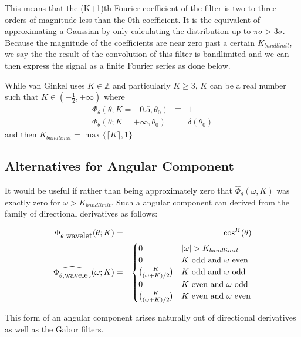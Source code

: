 \documentclass{article}
\DeclarePairedDelimiter\abs{\lvert}{\rvert}%
\begin{document}
This means that the (K+1)th Fourier coefficient of the filter is two to three orders of magnitude less than the 0th coefficient. It is the equivalent of approximating a Gaussian by only calculating the distribution up to $ \pi \sigma > 3 \sigma $. Because the magnitude of the coefficients are near zero past a certain $ K_{bandlimit} $, we say the the result of the convolution of this filter is bandlimited and we can then express the signal as a finite Fourier series as done below.

While van Ginkel uses $ K \in \mathbb{Z} $ and particularly $ K \geq 3 $, $ K $ can be a real number such that $ K \in (-\frac{1}{2},+\infty) $ where
\begin{eqnarray}
\Phi_{\theta}(\theta; K = -0.5,\theta_0) & \equiv & 1 \\
\Phi_{\theta}(\theta; K = +\infty,\theta_0) & = & \delta(\theta_0)
\end{eqnarray}
and then $K_{bandlimit} = \max\{\lceil K \rceil,1\} $


\subsection{Alternatives for Angular Component}

It would be useful if rather than being approximately zero that $ \widehat{\Phi}_{\theta}(\omega,K) $ was exactly zero for $ \omega > K_{bandlimit} $. Such a angular component can derived from the family of directional derivatives as follows:

\begin{eqnarray}
    \Phi_{\theta,\mbox{wavelet}}(\theta; K) & = & \cos^K(\theta) \\
    \widehat{\Phi_{\theta,\mbox{wavelet}}}(\omega; K) & = & 
    \begin{cases}
        0                               & \abs{\omega} > K_{bandlimit} \\
        0                               & K \mbox{ odd and }  \omega \mbox{ even} \\
        K \choose (\omega+K)/2 & K \mbox{ odd and }  \omega \mbox{ odd} \\
        0                               & K \mbox{ even and } \omega \mbox{ odd} \\
        K \choose (\omega+K)/2 & K \mbox{ even and } \omega \mbox{ even}
    \end{cases}
\end{eqnarray}

This form of an angular component arises naturally out of directional derivatives as well as the Gabor filters.
\end{document}
